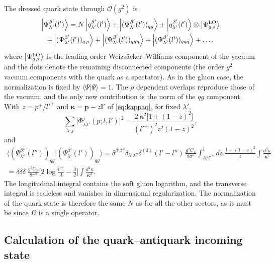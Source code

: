 \documentclass[11pt,a4paper]{article}
\numberwithin{equation}{section}
\newcommand{\dthree}{\delta^{(3)}}
\newcommand{\ket}[1]{\left|#1\right\rangle}
\newcommand{\OM}{\Omega}
\newcommand{\Ph}{\Phi}
\newcommand{\qk}[3]{q^{#1}_{#2}(#3)}
\newcommand{\order}[1]{\mathcal{O}(#1)}
\begin{document}
The dressed quark state through $\order{g^{2}}$ is
\begin{multline}
\ket{\Psi^{\beta'}_{\lambda'}(l')}=N\ket{\qk{\beta'}{\lambda'}{l'}}
+\ket{(\Psi^{\beta'}_{\lambda'}(l'))_{qg}}+\ket{\qk{\beta'}{\lambda'}{l'}}\otimes\ket{\Psi^{\rm LO}_{g\,\rho}}\\
+\ket{(\Psi^{\beta'}_{\lambda'}(l'))_{q\,\rho}}+\ket{(\Psi^{\beta'}_{\lambda'}(l'))_{qgg}}
+\ket{(\Psi^{\beta'}_{\lambda'}(l'))_{qq\bar q}}+\dots,
\label{eq:sum-q}
\end{multline}
where $\ket{\Psi^{\rm LO}_{g\,\rho}}$ is the leading order Weizs\"acker--Williams component of the
vacuum and the dots denote the remaining disconnected components (the order $g^{2}$ vacuum
components with the quark as a spectator). As in the gluon case, the normalization is fixed by
$\langle\Psi|\Psi\rangle=1$. The $\rho$ dependent overlaps reproduce those of the vacuum, and the
only new contribution is the norm of the $qg$ component. With $z=p^{+}/l'^{+}$ and
$\bm\kappa=\bm p-z\bm l'$ of \eqref{eq:kappaq}, for fixed $\lambda'$,
\begin{equation}
\sum_{\lambda,j}\big|\Ph^{j}_{\lambda\lambda'}(p;l,l')\big|^{2}
=\frac{2\,\bm\kappa^{2}\big[1+(1-z)^{2}\big]}{(l'^{+})^{2}z^{2}(1-z)^{2}},
\end{equation}
and
\begin{multline}
\big\langle(\Psi^{\beta''}_{\lambda''}(l''))_{qg}\big|(\Psi^{\beta'}_{\lambda'}(l'))_{qg}\big\rangle
=\delta^{\beta'\beta''}\delta_{\lambda'\lambda''}\dthree(l'-l'')\,\frac{g^{2}C_{F}}{8\pi^{3}}
\int_{\Lambda/l'^{+}}^{1}\!dz\;\frac{1+(1-z)^{2}}{z}\int\!\frac{d^{2}\kappa}{\bm\kappa^{2}}\\
=\delta\delta\delta\;\frac{g^{2}C_{F}}{8\pi^{3}}\Big[2\log\frac{l'^{+}}{\Lambda}-\frac32\Big]\int\!\frac{d^{2}\kappa}{\bm\kappa^{2}} .
\label{eq:qnorm}
\end{multline}
The longitudinal integral contains the soft gluon logarithm, and the transverse integral is
scaleless and vanishes in dimensional regularization. The normalization of the quark state is
therefore the same $N$ as for all the other sectors, as it must be since $\OM$ is a single
operator.

\subsection{Calculation of the quark--antiquark incoming state}
\label{sec:wf-qq}
\end{document}
